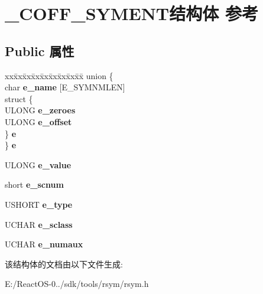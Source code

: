 \hypertarget{struct___c_o_f_f___s_y_m_e_n_t}{}\section{\+\_\+\+C\+O\+F\+F\+\_\+\+S\+Y\+M\+E\+N\+T结构体 参考}
\label{struct___c_o_f_f___s_y_m_e_n_t}
\subsection*{Public 属性}
\begin{DoxyCompactItemize}
\item 
\mbox{\label{struct___c_o_f_f___s_y_m_e_n_t_adc151101388c23d26378c58b3115fe40}} 
\begin{tabbing}
xx\=xx\=xx\=xx\=xx\=xx\=xx\=xx\=xx\=\kill
union \{\\
\>char {\bfseries e\_name} \mbox{[}E\_SYMNMLEN\mbox{]}\\
\>struct \{\\
\>\>ULONG {\bfseries e\_zeroes}\\
\>\>ULONG {\bfseries e\_offset}\\
\>\} {\bfseries e}\\
\} {\bfseries e}\\

\end{tabbing}\item 
\mbox{\label{struct___c_o_f_f___s_y_m_e_n_t_a2fc852c55d008dd5987feb43054e6fad}} 
U\+L\+O\+NG {\bfseries e\+\_\+value}
\item 
\mbox{\label{struct___c_o_f_f___s_y_m_e_n_t_af80eff5a346226e2afc3c080d3db27c5}} 
short {\bfseries e\+\_\+scnum}
\item 
\mbox{\label{struct___c_o_f_f___s_y_m_e_n_t_a02cde1cbb667d2b34aa4646442666e0f}} 
U\+S\+H\+O\+RT {\bfseries e\+\_\+type}
\item 
\mbox{\label{struct___c_o_f_f___s_y_m_e_n_t_a8516ee042a456172f6718410a09b49bc}} 
U\+C\+H\+AR {\bfseries e\+\_\+sclass}
\item 
\mbox{\label{struct___c_o_f_f___s_y_m_e_n_t_a7648e84f4612d4c8c6d1a55635a34276}} 
U\+C\+H\+AR {\bfseries e\+\_\+numaux}
\end{DoxyCompactItemize}


该结构体的文档由以下文件生成\+:\begin{DoxyCompactItemize}
\item 
E\+:/\+React\+O\+S-\/0../sdk/tools/rsym/rsym.\+h\end{DoxyCompactItemize}
